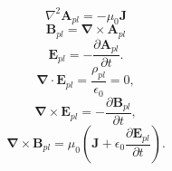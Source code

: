 \begin{frame}

\begin{equation}
\nabla^2 \bm{A}_{pl}=-\mu_0\bm{J} 
\end{equation}
\begin{equation}
\bm{B}_{pl} = \bm{\nabla} \times \bm{A}_{pl}
\end{equation}
\begin{equation}
\bm{E}_{pl}=-\frac{\partial \bm{A}_{pl}}{\partial t} .
\end{equation}
\begin{equation}
\bm{\nabla} \cdot \bm{E}_{pl} = \frac{\rho_{pl}}{\epsilon_0}=0,
\end{equation}
\begin{equation}
\bm{\nabla} \times \bm{E}_{pl} = -\frac{\partial \bm{B}_{pl}}{\partial t},
\end{equation}
\begin{equation}
\bm{\nabla} \times \bm{B}_{pl} = \mu_0 (\bm{J} + \epsilon_0 \frac{\partial \bm{E}_{pl}}{\partial t} ).
\end{equation}


\end{frame}
